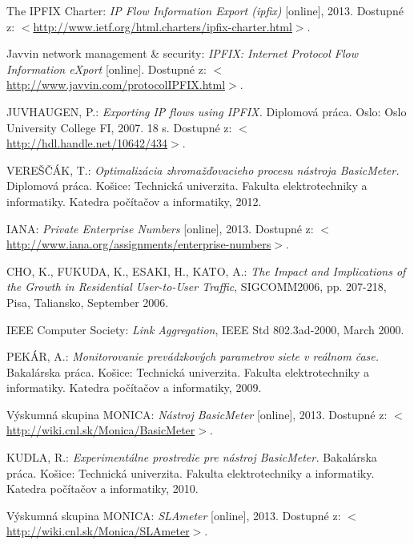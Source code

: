 \begin{thebibliography}{999}
The IPFIX Charter: \emph{IP Flow Information Export (ipfix)} [online], 2013. Dostupné 
z: $<$\url{http://www.ietf.org/html.charters/ipfix-charter.html}$>$.

Javvin network management \& security: \emph{IPFIX: Internet Protocol Flow Information eXport} [online]. Dostupné 
z: $<$\url{http://www.javvin.com/protocolIPFIX.html}$>$.

JUVHAUGEN, P.: \emph{Exporting IP flows using IPFIX.} 
Diplomová práca. Oslo: Oslo University College FI, 2007. 18 s. Dostupné 
z: $<$\url{http://hdl.handle.net/10642/434}$>$.

VEREŠČÁK, T.: \emph{Optimalizácia zhromažďovacieho procesu nástroja BasicMeter.} 
Diplomová práca. Košice: Technická univerzita. Fakulta elektrotechniky a informatiky. 
Katedra počítačov a informatiky, 2012.

IANA: \emph{Private Enterprise Numbers} [online], 2013. Dostupné 
z: $<$\url{http://www.iana.org/assignments/enterprise-numbers}$>$.

CHO, K., FUKUDA, K., ESAKI, H., KATO, A.: \emph{The Impact and Implications of the Growth in Residential
User-to-User Traffic}, SIGCOMM2006, pp. 207-218, Pisa, Taliansko, September 2006.

IEEE Computer Society: \emph{Link Aggregation}, IEEE Std 802.3ad-2000, March 2000.

PEKÁR, A.: \emph{Monitorovanie prevádzkových parametrov siete v reálnom čase.} 
Bakalárska práca. Košice: Technická univerzita. Fakulta elektrotechniky a informatiky. 
Katedra počítačov a informatiky, 2009.

Výskumná skupina MONICA: \emph{Nástroj BasicMeter} [online], 2013. 
Dostupné z: $<$\url{http://wiki.cnl.sk/Monica/BasicMeter}$>$.

KUDLA, R.: \emph{Experimentálne prostredie pre nástroj BasicMeter.} 
Bakalárska práca. Košice: Technická univerzita. Fakulta elektrotechniky a informatiky. 
Katedra počítačov a informatiky, 2010.

Výskumná skupina MONICA: \emph{SLAmeter} [online], 2013. 
Dostupné z: $<$\url{http://wiki.cnl.sk/Monica/SLAmeter}$>$.


\end{thebibliography}
